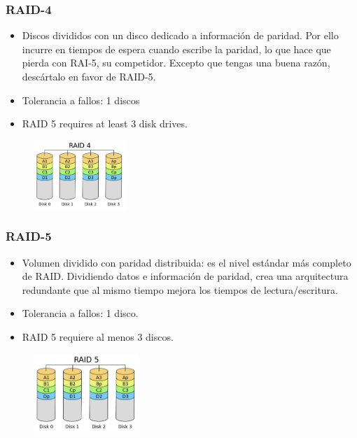 \documentclass{beamer}
\begin{document}
\begin{frame}
  \frametitle{RAID-4}

  \begin{itemize}
    \item Discos divididos con un disco dedicado a información de paridad. Por ello incurre en tiempos de espera cuando escribe la paridad, lo que hace que pierda con RAI-5, su competidor. Excepto que tengas una buena razón, descártalo en favor de RAID-5.
    \item Tolerancia a fallos: 1 discos
    \item RAID 5 requires at least 3 disk drives.
  \end{itemize}

\begin{figure}[h]
\begin{center}
  \includegraphics[width=3.5cm]{figs/RAID_4.png}
\end{center}
\end{figure}

\end{frame}


\begin{frame}
  \frametitle{RAID-5}

  \begin{itemize}
    \item Volumen dividido con paridad distribuida: es el nivel estándar más completo de RAID. Dividiendo datos e información de paridad, crea una arquitectura redundante que al mismo tiempo mejora los tiempos de lectura/escritura.
    \item Tolerancia a fallos: 1 disco.
    \item RAID 5 requiere al menos 3 discos.
  \end{itemize}

\begin{figure}[h]
\begin{center}
  \includegraphics[width=4cm]{figs/RAID_5.png}
\end{center}
\end{figure}

\end{frame}
\end{document}
